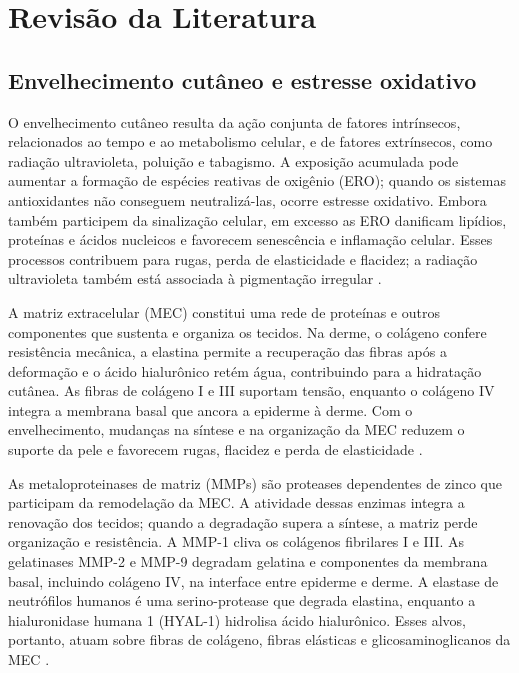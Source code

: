 \section{Revisão da Literatura}
\subsection{Envelhecimento cutâneo e estresse oxidativo}
O envelhecimento cutâneo resulta da ação conjunta de fatores intrínsecos, relacionados ao tempo e ao metabolismo celular, e de fatores extrínsecos, como radiação ultravioleta, poluição e tabagismo. A exposição acumulada pode aumentar a formação de espécies reativas de oxigênio (ERO); quando os sistemas antioxidantes não conseguem neutralizá-las, ocorre estresse oxidativo. Embora também participem da sinalização celular, em excesso as ERO danificam lipídios, proteínas e ácidos nucleicos e favorecem senescência e inflamação celular. Esses processos contribuem para rugas, perda de elasticidade e flacidez; a radiação ultravioleta também está associada à pigmentação irregular \parencite{liu2023,papaccio2022}.

A matriz extracelular (MEC) constitui uma rede de proteínas e outros componentes que sustenta e organiza os tecidos. Na derme, o colágeno confere resistência mecânica, a elastina permite a recuperação das fibras após a deformação e o ácido hialurônico retém água, contribuindo para a hidratação cutânea. As fibras de colágeno I e III suportam tensão, enquanto o colágeno IV integra a membrana basal que ancora a epiderme à derme. Com o envelhecimento, mudanças na síntese e na organização da MEC reduzem o suporte da pele e favorecem rugas, flacidez e perda de elasticidade \parencite{liu2025,papaccio2022}.

As metaloproteinases de matriz (MMPs) são proteases dependentes de zinco que participam da remodelação da MEC. A atividade dessas enzimas integra a renovação dos tecidos; quando a degradação supera a síntese, a matriz perde organização e resistência. A MMP-1 cliva os colágenos fibrilares I e III. As gelatinases MMP-2 e MMP-9 degradam gelatina e componentes da membrana basal, incluindo colágeno IV, na interface entre epiderme e derme. A elastase de neutrófilos humanos é uma serino-protease que degrada elastina, enquanto a hialuronidase humana 1 (HYAL-1) hidrolisa ácido hialurônico. Esses alvos, portanto, atuam sobre fibras de colágeno, fibras elásticas e glicosaminoglicanos da MEC \parencite{chao2007,liu2025,macdonald2002,papaccio2022}.

